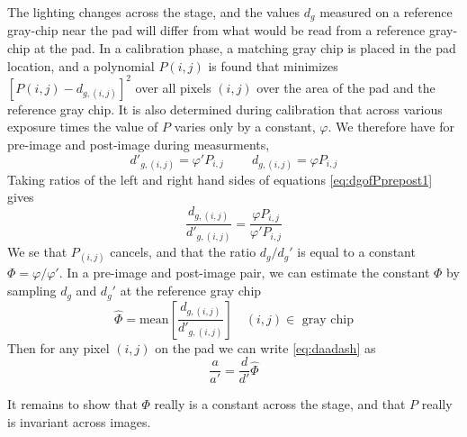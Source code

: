 \documentclass[11pt,letter]{article}
\begin{document}
The lighting changes across the stage, and the values $d_g$ measured on a reference gray-chip near the pad will differ from what would be read from a reference gray-chip at the pad.
In a calibration phase, a matching gray chip is placed in the pad location, and a polynomial $P(i,j)$ is found 
that minimizes $[P(i,j) - d_{g,(i,j)}]^2$ over all pixels $(i,j)$ over the area of the pad and the reference gray chip.
It is also determined during calibration that across various exposure times the value of $P$ varies only by a constant, $\varphi$. 
We therefore have for pre-image and post-image during measurments, 
\begin{equation} \label{eq:dgofPprepost1}
	d'_{g,(i,j)} = \varphi' P_{i,j} \qquad \ d_{g,(i,j)} = \varphi P_{i,j} 
\end{equation}
Taking ratios of the left and right hand sides of equations \eqref{eq:dgofPprepost1} gives
\begin{equation} \label{eq:dgofPprepost2}
	\frac{d_{g,(i,j)}}{d'_{g,(i,j)}} = \frac{\varphi P_{i,j}}{\varphi' P_{i,j}} 
\end{equation}
We se that $P_{(i,j)}$ cancels, and that the ratio $d_g/d_g'$ is equal to a constant $\Phi = \varphi/\varphi'$.
In a pre-image and post-image pair, we can estimate the constant $\Phi$ by sampling $d_g$ and $d_g'$ at the reference gray chip
\begin{equation} \label{eq:dgofPprepost3}
	\widehat\Phi = \text{mean}\left[\frac{d_{g,(i,j)}}{d'_{g,(i,j)}}\right] \quad (i,j)\in\text{ gray chip}
\end{equation}
Then for any pixel $(i,j)$ on the pad we can write \eqref{eq:daadash} as 
\begin{equation}
	\frac{a}{a'} = \frac{d}{d'} \widehat\Phi
	\label{eq:daadashPhi}
\end{equation}

It remains to show that $\Phi$ really is a constant across the stage, 
and that $P$ really is invariant across images.
\end{document}
